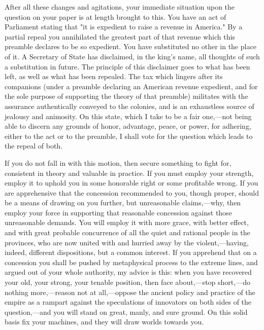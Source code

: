 After all these changes and agitations, your immediate situation upon the question on your paper is at length brought to this. You have an act of Parliament stating that "it is expedient to raise a revenue in America." By a partial repeal you annihilated the greatest part of that revenue which this preamble declares to be so expedient. You have substituted no other in the place of it. A Secretary of State has disclaimed, in the king's name, all thoughts of such a substitution in future. The principle of this disclaimer goes to what has been left, as well as what has been repealed. The tax which lingers after its companions (under a preamble declaring an American revenue expedient, and for the sole purpose of supporting the theory of that preamble) militates with the assurance authentically conveyed to the colonies, and is an exhaustless source of jealousy and animosity. On this state, which I take to be a fair one,—not being able to discern any grounds of honor, advantage, peace, or power, for adhering, either to the act or to the preamble, I shall vote for the question which leads to the repeal of both.

If you do not fall in with this motion, then secure something to fight for, consistent in theory and valuable in practice. If you must employ your strength, employ it to uphold you in some honorable right or some profitable wrong. If you are apprehensive that the concession recommended to you, though proper, should be a means of drawing on you further, but unreasonable claims,—why, then employ your force in supporting that reasonable concession against those unreasonable demands. You will employ it with more grace, with better effect, and with great probable concurrence of all the quiet and rational people in the provinces, who are now united with and hurried away by the violent,—having, indeed, different dispositions, but a common interest. If you apprehend that on a concession you shall be pushed by metaphysical process to the extreme lines, and argued out of your whole authority, my advice is this: when you have recovered your old, your strong, your tenable position, then face about,—stop short,—do nothing more,—reason not at all,—oppose the ancient policy and practice of the empire as a rampart against the speculations of innovators on both sides of the question,—and you will stand on great, manly, and sure ground. On this solid basis fix your machines, and they will draw worlds towards you.

